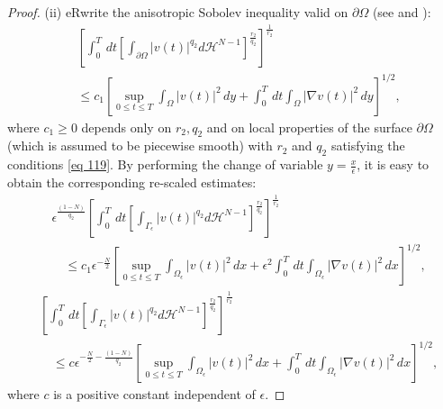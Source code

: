 \begin{proof}
(ii) eRwrite the anisotropic Sobolev inequality valid on $\partial \Omega$ (see \cite{Ladyzenskaja_Solonnikov_Uralceva_1968} and \cite{Nittka_2011}):
\begin{equation}
  \begin{aligned}
&{\left[\int_{0}^{T} \, d  t\left[\int_{\partial \Omega}|v(t)|^{q_{2}} d \mathcal{H}^{N-1}\right]^{\frac{r_{2}}{q_{2}}}\right]^{\frac{1}{r_{2}}}} \\
&\leq c_{1}\left[\sup _{0 \leq t \leq T} \int_{\Omega}|v(t)|^{2} \, d  y+\int_{0}^{T} \, d  t \int_{\Omega}|\nabla v(t)|^{2} \, d  y\right]^{1 / 2},
\end{aligned}
\label{124}\end{equation}
where $c_{1} \geq 0$ depends only on $r_{2}, q_{2}$ and on local properties of the surface $\partial \Omega$ (which is assumed to be piecewise smooth) with $r_{2}$ and $q_{2}$ satisfying the conditions \eqref{eq 119}. By performing the change of variable $y=\frac{x}{\epsilon}$, it is easy to obtain the corresponding re-scaled estimates:
\begin{equation}
  \begin{aligned}
&\epsilon^{\frac{(1-N)}{q_{2}}}\left[\int_{0}^{T} \, d  t\left[\int_{\Gamma_{\epsilon}}|v(t)|^{q_{2}} d \mathcal{H}^{N-1}\right]^{\frac{r_{2}}{q_{2}}}\right]^{\frac{1}{r_{2}}} \\
&\quad \leq c_{1} \epsilon^{-\frac{N}{2}}\left[\sup _{0 \leq t \leq T} \int_{\Omega_{\epsilon}}|v(t)|^{2} \, d  x+\epsilon^{2} \int_{0}^{T} \, d  t \int_{\Omega_{\epsilon}}|\nabla v(t)|^{2} \, d  x\right]^{1 / 2},
\end{aligned}
\label{eq 125}\end{equation}
\begin{equation}
\begin{aligned}
&{\left[\int_{0}^{T} \, d  t\left[\int_{\Gamma_{\epsilon}}|v(t)|^{q_{2}} d \mathcal{H}^{N-1}\right]^{\frac{r_{2}}{q_{2}}}\right]^{\frac{1}{r_{2}}}} \\
&\quad \leq c \epsilon^{-\frac{N}{2}-\frac{(1-N)}{q_{2}}}\left[\sup _{0 \leq t \leq T} \int_{\Omega_{\epsilon}}|v(t)|^{2} \, d  x+\int_{0}^{T} \, d  t \int_{\Omega_{\epsilon}}|\nabla v(t)|^{2} \, d  x\right]^{1 / 2},
\end{aligned}
\label{eq 126}\end{equation}
where $c$ is a positive constant independent of $\epsilon$.
\end{proof}
